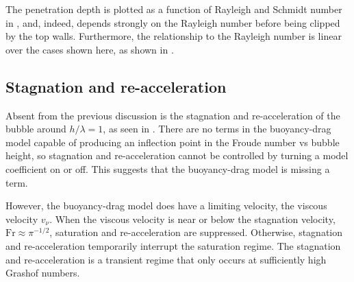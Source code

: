 The penetration depth is plotted as a function of Rayleigh and Schmidt number in , and, indeed, depends strongly on the Rayleigh number before being clipped by the top walls.
Furthermore, the relationship to the Rayleigh number is linear over the cases shown here, as shown in .

\subsection{Stagnation and re-acceleration}

Absent from the previous discussion is the stagnation and re-acceleration of the bubble around $h / \lambda = 1$, as seen in .
There are no terms in the buoyancy-drag model capable of producing an inflection point in the Froude number vs bubble height, so stagnation and re-acceleration cannot be controlled by turning a model coefficient on or off.
This suggests that the buoyancy-drag model is missing a term.

However, the buoyancy-drag model does have a limiting velocity, the viscous velocity $v_\nu$.
When the viscous velocity is near or below the stagnation velocity, $\text{Fr} \approx \pi^{-1/2}$, saturation and re-acceleration are suppressed.
Otherwise, stagnation and re-acceleration temporarily interrupt the saturation regime.
The stagnation and re-acceleration is a transient regime that only occurs at sufficiently high Grashof numbers.

